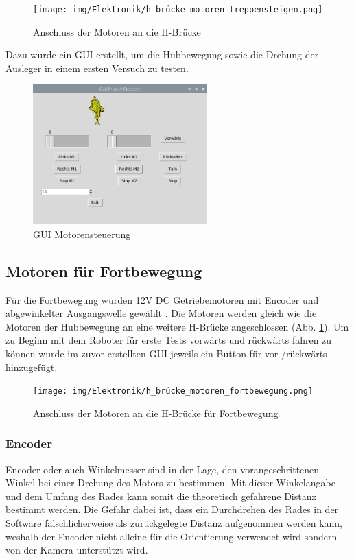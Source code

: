 \begin{figure}[H]
  \texttt{[image: img/Elektronik/h\_brücke\_motoren\_treppensteigen.png]}
  \centering
  \caption{Anschluss der Motoren an die H-Brücke}
  \label{fig:hbrücke-treppe}
\end{figure}

Dazu wurde ein GUI erstellt, um die Hubbewegung sowie die Drehung der Ausleger in einem ersten Versuch zu testen.

\begin{figure}[H]
  \includegraphics[width=0.6\textwidth]{img/Elektronik/gui_motoren.png}
  \centering
  \caption{GUI Motorensteuerung}
  \label{fig:gui-motoren}
\end{figure}

\newpage

\subsection{Motoren für Fortbewegung}
Für die Fortbewegung wurden 12V DC Getriebemotoren mit Encoder und abgewinkelter Ausgangswelle gewählt \cite{Motoren-Fortbewegung}. Die Motoren werden gleich wie die Motoren der Hubbewegung an eine weitere H-Brücke angeschlossen (Abb. \ref{fig:hbrücke-treppe}).
Um zu Beginn mit dem Roboter für erste Tests vorwärts und rückwärts fahren zu können wurde im zuvor erstellten GUI jeweils ein Button für vor-/rückwärts hinzugefügt.

\begin{figure}[H]
  \texttt{[image: img/Elektronik/h\_brücke\_motoren\_fortbewegung.png]}
  \centering
  \caption{Anschluss der Motoren an die H-Brücke für Fortbewegung}
  \label{fig:hbrücke-fortbeweg}
\end{figure}

\subsubsection{Encoder}
Encoder oder auch Winkelmesser sind in der Lage, den vorangeschrittenen Winkel bei einer Drehung des Motors zu bestimmen. Mit dieser Winkelangabe und dem Umfang des Rades kann somit die theoretisch gefahrene Distanz bestimmt werden. Die Gefahr dabei ist, dass ein Durchdrehen des Rades in der Software fälschlicherweise als zurückgelegte Distanz aufgenommen werden kann, weshalb der Encoder nicht alleine für die Orientierung verwendet wird sondern von der Kamera unterstützt wird.

